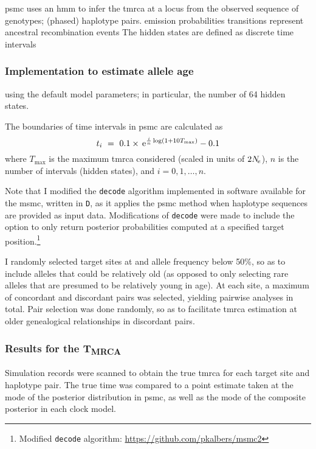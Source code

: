 \Gls{psmc} uses an \gls{hmm} to infer the \gls{tmrca} at a locus from the observed sequence of genotypes; \ie (phased) haplotype pairs.
emission probabilities
transitions represent ancestral recombination events
The hidden states are defined as discrete time intervals



%
\subsubsection{Implementation to estimate allele age}
%


using the default model parameters; in particular, the number of 64 hidden states.

The boundaries of time intervals in \gls{psmc} are calculated as
\begin{equation*}
	t_i ~=~ 0.1 \times \,\mathrm{e}^{\frac{i}{n}\log(1 + 10  T_{\max})} - 0.1
\end{equation*}
where $T_{\max}$ is the maximum \gls{tmrca} considered (scaled in units of $2N_{\!e}$), $n$ is the number of intervals (\ie hidden states), and ${i=0,1,\ldots,n}$.

Note that I modified the \texttt{decode} algorithm implemented in software available for the \gls{msmc}, written in \texttt{D}, as it applies the \gls{psmc} method when  haplotype sequences are provided as input data.
Modifications of \texttt{decode} were made to include the option to only return posterior probabilities computed at a specified target position.\footnote{Modified \texttt{decode} algorithm: \url{https://github.com/pkalbers/msmc2} }




I randomly selected  target sites at  and allele frequency below 50\%, so as to include alleles that could be relatively old (as opposed to only selecting rare alleles that are presumed to be relatively young in age).
At each site, a maximum of  concordant and  discordant pairs was selected, yielding  pairwise analyses in total.
Pair selection was done randomly, so as to facilitate \gls{tmrca} estimation at older genealogical relationships in discordant pairs.


%
\subsubsection{Results for the T\textsubscript{MRCA}}
%

Simulation records were scanned to obtain the true \gls{tmrca} for each target site and haplotype pair.
The true time was compared to a point estimate taken at the mode of the posterior distribution in \gls{psmc},
as well as the mode of the composite posterior in each clock model.


